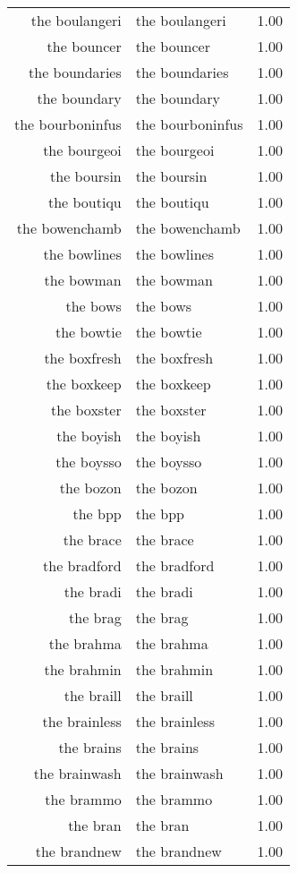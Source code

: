 \begin{table}[ht]
\begin{tabular}{rlr}
  the boulangeri & the boulangeri & 1.00 \\ 
  the bouncer & the bouncer & 1.00 \\ 
  the boundaries & the boundaries & 1.00 \\ 
  the boundary & the boundary & 1.00 \\ 
  the bourboninfus & the bourboninfus & 1.00 \\ 
  the bourgeoi & the bourgeoi & 1.00 \\ 
  the boursin & the boursin & 1.00 \\ 
  the boutiqu & the boutiqu & 1.00 \\ 
  the bowenchamb & the bowenchamb & 1.00 \\ 
  the bowlines & the bowlines & 1.00 \\ 
  the bowman & the bowman & 1.00 \\ 
  the bows & the bows & 1.00 \\ 
  the bowtie & the bowtie & 1.00 \\ 
  the boxfresh & the boxfresh & 1.00 \\ 
  the boxkeep & the boxkeep & 1.00 \\ 
  the boxster & the boxster & 1.00 \\ 
  the boyish & the boyish & 1.00 \\ 
  the boysso & the boysso & 1.00 \\ 
  the bozon & the bozon & 1.00 \\ 
  the bpp & the bpp & 1.00 \\ 
  the brace & the brace & 1.00 \\ 
  the bradford & the bradford & 1.00 \\ 
  the bradi & the bradi & 1.00 \\ 
  the brag & the brag & 1.00 \\ 
  the brahma & the brahma & 1.00 \\ 
  the brahmin & the brahmin & 1.00 \\ 
  the braill & the braill & 1.00 \\ 
  the brainless & the brainless & 1.00 \\ 
  the brains & the brains & 1.00 \\ 
  the brainwash & the brainwash & 1.00 \\ 
  the brammo & the brammo & 1.00 \\ 
  the bran & the bran & 1.00 \\ 
  the brandnew & the brandnew & 1.00 \\ 

\end{tabular}
\end{table}
